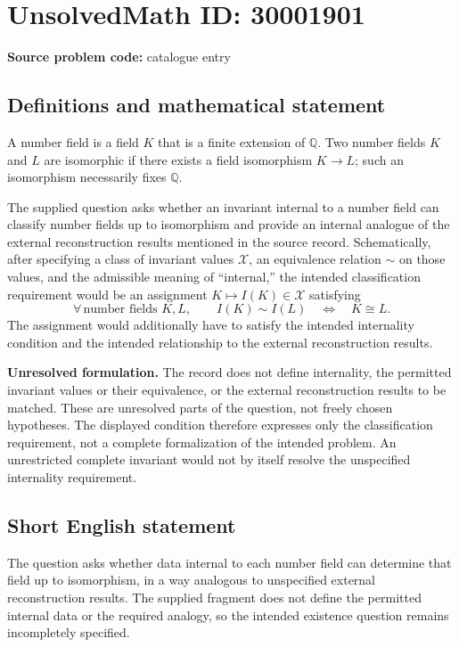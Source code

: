 \documentclass[11pt]{article}
\newcommand{\Q}{\mathbb{Q}}
\begin{document}
\section*{UnsolvedMath ID: 30001901}
\textbf{Source problem code:} catalogue entry
\subsection{Definitions and mathematical statement}
A number field is a field \(K\) that is a finite extension of \(\Q\). Two number fields \(K\) and \(L\) are isomorphic if there exists a field isomorphism \(K\to L\); such an isomorphism necessarily fixes \(\Q\).

The supplied question asks whether an invariant internal to a number field can classify number fields up to isomorphism and provide an internal analogue of the external reconstruction results mentioned in the source record. Schematically, after specifying a class of invariant values \(\mathcal X\), an equivalence relation \(\sim\) on those values, and the admissible meaning of ``internal,'' the intended classification requirement would be an assignment \(K\mapsto I(K)\in\mathcal X\) satisfying
\[
\forall\,\text{number fields }K,L,\qquad
I(K)\sim I(L)\quad\Longleftrightarrow\quad K\cong L.
\]
The assignment would additionally have to satisfy the intended internality condition and the intended relationship to the external reconstruction results.

\textbf{Unresolved formulation.} The record does not define internality, the permitted invariant values or their equivalence, or the external reconstruction results to be matched. These are unresolved parts of the question, not freely chosen hypotheses. The displayed condition therefore expresses only the classification requirement, not a complete formalization of the intended problem. An unrestricted complete invariant would not by itself resolve the unspecified internality requirement.
\subsection{Short English statement}
The question asks whether data internal to each number field can determine that field up to isomorphism, in a way analogous to unspecified external reconstruction results. The supplied fragment does not define the permitted internal data or the required analogy, so the intended existence question remains incompletely specified.
\end{document}
